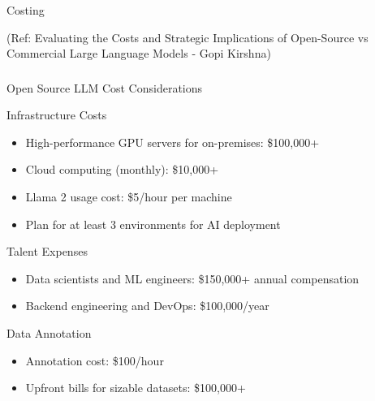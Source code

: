 \begin{frame}[fragile]\frametitle{}
\begin{center}
{\Large Costing}

{\tiny (Ref: Evaluating the Costs and Strategic Implications of Open-Source vs Commercial Large Language Models - Gopi Kirshna)}

\end{center}
\end{frame}

\begin{frame}[fragile]\frametitle{}
\begin{center}
{\Large Open Source LLM Cost Considerations}
\end{center}
\end{frame}

\begin{frame}[fragile]{Infrastructure Costs}
  \begin{itemize}
    \item High-performance GPU servers for on-premises: \$100,000+
    \item Cloud computing (monthly): \$10,000+
    \item Llama 2 usage cost: \$5/hour per machine
    \item Plan for at least 3 environments for AI deployment
  \end{itemize}
\end{frame}

\begin{frame}[fragile]{Talent Expenses}
  \begin{itemize}
    \item Data scientists and ML engineers: \$150,000+ annual compensation
    \item Backend engineering and DevOps: \$100,000/year
  \end{itemize}
\end{frame}

\begin{frame}[fragile]{Data Annotation}
  \begin{itemize}
    \item Annotation cost: \$100/hour
    \item Upfront bills for sizable datasets: \$100,000+
  \end{itemize}
\end{frame}

